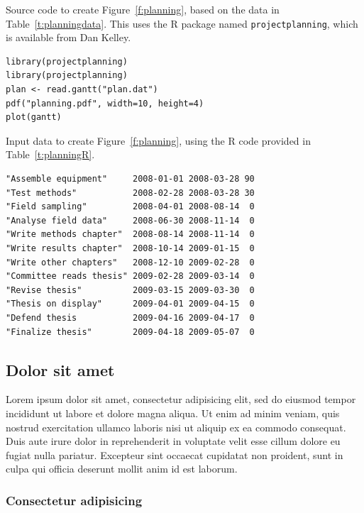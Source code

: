 \documentclass[logo=logo-eagle]{thesis_proposal}
\begin{document}
\begin{table}[tp]
    \caption{\label{t:planningR}Source code to create
      Figure~\ref{f:planning}, based on the data in
      Table~\ref{t:planningdata}.  This uses the R package
      named \texttt{projectplanning}, which is available from Dan Kelley.}
  \begin{verbatim}
library(projectplanning)
library(projectplanning)
plan <- read.gantt("plan.dat")
pdf("planning.pdf", width=10, height=4)
plot(gantt)
  \end{verbatim}
\end{table}


\begin{table}[tp]
    \caption{\label{t:planningdata}Input data to create
      Figure~\ref{f:planning}, using the R code provided
      in Table~\ref{t:planningR}.
}
  \begin{verbatim}
"Assemble equipment"     2008-01-01 2008-03-28 90
"Test methods"           2008-02-28 2008-03-28 30
"Field sampling"         2008-04-01 2008-08-14  0
"Analyse field data"     2008-06-30 2008-11-14  0
"Write methods chapter"  2008-08-14 2008-11-14  0
"Write results chapter"  2008-10-14 2009-01-15  0
"Write other chapters"   2008-12-10 2009-02-28  0
"Committee reads thesis" 2009-02-28 2009-03-14  0
"Revise thesis"          2009-03-15 2009-03-30  0
"Thesis on display"      2009-04-01 2009-04-15  0
"Defend thesis           2009-04-16 2009-04-17  0
"Finalize thesis"        2009-04-18 2009-05-07  0
  \end{verbatim}
\end{table}


\subsection{Dolor sit amet}

Lorem ipsum dolor sit amet, consectetur adipisicing elit, sed do
eiusmod tempor incididunt ut labore et dolore magna aliqua. Ut enim ad
minim veniam, quis nostrud exercitation ullamco laboris nisi ut
aliquip ex ea commodo consequat. Duis aute irure dolor in
reprehenderit in voluptate velit esse cillum dolore eu fugiat nulla
pariatur. Excepteur sint occaecat cupidatat non proident, sunt in
culpa qui officia deserunt mollit anim id est laborum.

\subsubsection{Consectetur adipisicing}
\end{document}
